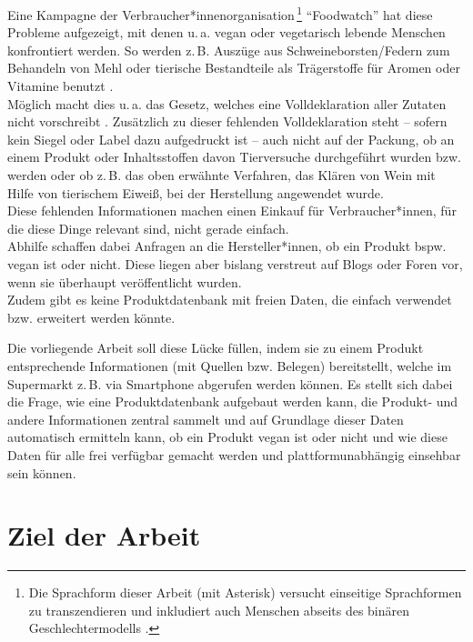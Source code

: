 Eine Kampagne der Verbraucher*innenorganisation\,\footnote{Die
Sprachform dieser Arbeit (mit Asterisk) versucht einseitige
Sprachformen zu transzendieren und inkludiert auch Menschen abseits
des binären Geschlechtermodells .}
"`Foodwatch"' hat diese
Probleme aufgezeigt, mit denen u.\,a. vegan oder vegetarisch lebende Menschen
konfrontiert werden. So werden z.\,B. Auszüge aus Schweineborsten/Federn zum Behandeln von
Mehl oder tierische Bestandteile als Trägerstoffe für Aromen oder
Vitamine benutzt .\\
Möglich macht dies u.\,a. das Gesetz, welches eine Volldeklaration aller
Zutaten nicht vorschreibt .
Zusätzlich zu dieser fehlenden Volldeklaration steht -- sofern kein
Siegel oder Label dazu aufgedruckt ist -- auch nicht auf der Packung, ob an
einem Produkt oder Inhaltsstoffen davon Tierversuche 
durchgeführt wurden bzw. werden oder ob z.\,B. das oben erwähnte Verfahren,
das Klären von Wein mit Hilfe von tierischem Eiweiß, bei der
Herstellung angewendet wurde.\\
Diese fehlenden Informationen machen einen Einkauf für
Verbraucher*innen, für die diese Dinge relevant sind, nicht gerade
einfach.\\
Abhilfe schaffen dabei Anfragen an die Hersteller*innen, ob ein Produkt
bspw. vegan ist oder nicht. Diese liegen aber bislang
verstreut auf Blogs oder Foren vor, wenn sie überhaupt
veröffentlicht wurden.\\
Zudem gibt es keine Produktdatenbank mit freien Daten, die einfach
verwendet bzw. erweitert werden könnte.

Die vorliegende Arbeit soll diese Lücke füllen, indem sie zu
einem Produkt entsprechende Informationen (mit Quellen bzw. Belegen)
bereitstellt, welche im Supermarkt z.\,B. via Smartphone
abgerufen werden können.
Es stellt sich dabei die Frage, wie eine Produktdatenbank aufgebaut
werden kann, die Produkt- und andere Informationen zentral sammelt und auf
Grundlage dieser Daten automatisch ermitteln kann, ob ein Produkt
vegan ist oder nicht und wie diese Daten für alle frei verfügbar
gemacht werden und plattformunabhängig einsehbar sein können.

\section{Ziel der Arbeit}
\label{sec:aim}


